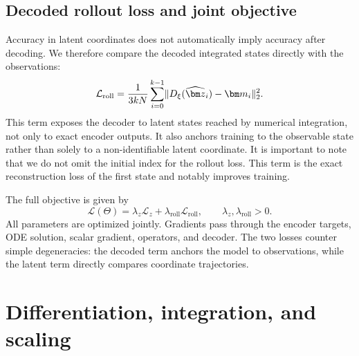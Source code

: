 \documentclass[a4paper,11pt]{article}
\newcommand{\m}{\bm m}
\newcommand{\Ddec}{D_{\xi}}
\newcommand{\zhat}{\widehat{\bm z}}
\DeclarePairedDelimiter{\norm}{\lVert}{\rVert}
\begin{document}
\subsection{Decoded rollout loss and joint objective}
Accuracy in latent coordinates does not automatically imply accuracy after
decoding. We therefore compare the decoded integrated states directly with the
observations:
\begin{equation}
  \mathcal L_{\mathrm{roll}}
  =\frac{1}{3 k N}
   \sum_{i=0}^{k-1}
   \norm{\Ddec(\zhat_i)-\m_i}_2^2.
  \label{eq:rollout_loss}
\end{equation}
This term exposes the decoder to latent states reached by numerical
integration, not only to exact encoder outputs. It also anchors training to the
observable state rather than solely to a non-identifiable latent coordinate.
It is important to note that we do not omit the initial index for the rollout loss. This term is the exact reconstruction loss of the first state and notably improves training.

The full objective is given by
\begin{equation}
 \mathcal L(\Theta)=\lambda_z\mathcal L_z+\lambda_{\mathrm{roll}}\mathcal L_{\mathrm{roll}},\qquad \lambda_z,\lambda_{\mathrm{roll}}>0.
 \label{eq:objective}
\end{equation}
All parameters are optimized jointly. Gradients pass through the encoder targets, ODE solution, scalar gradient, operators, and decoder. The two losses counter simple degeneracies: the decoded term anchors the model to observations, while the latent term directly compares coordinate trajectories.

\section{Differentiation, integration, and scaling}
\end{document}
